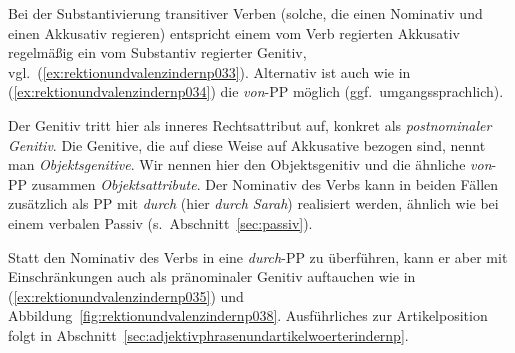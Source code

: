 \begin{exe}
  \ex\label{ex:rektionundvalenzindernp030}
  \begin{xlist}
  \end{xlist}
\end{exe}


Bei der Substantivierung transitiver Verben (solche, die einen Nominativ und einen Akkusativ regieren) entspricht einem vom Verb regierten Akkusativ regelmäßig ein vom Substantiv regierter Genitiv, vgl.\ (\ref{ex:rektionundvalenzindernp033}).
Alternativ ist auch wie in (\ref{ex:rektionundvalenzindernp034}) die \textit{von}-PP möglich (ggf.\ umgangssprachlich).

\begin{exe}
  \ex\label{ex:rektionundvalenzindernp031}
  \begin{xlist}
  \end{xlist}
\end{exe}

Der Genitiv tritt hier als inneres Rechtsattribut auf, konkret als \textit{postnominaler Genitiv}.
Die Genitive, die auf diese Weise auf Akkusative bezogen sind, nennt man \textit{Objektsgenitive}.
Wir nennen hier den Objektsgenitiv und die ähnliche \textit{von}-PP zusammen \textit{Objektsattribute}.
Der Nominativ des Verbs kann in beiden Fällen zusätzlich als PP mit \textit{durch} (hier \textit{durch Sarah}) realisiert werden, ähnlich wie bei einem verbalen Passiv (s.\ Abschnitt~\ref{sec:passiv}).


Statt den Nominativ des Verbs in eine \textit{durch}-PP zu überführen, kann er aber mit Einschränkungen auch als pränominaler Genitiv auftauchen wie in (\ref{ex:rektionundvalenzindernp035}) und Abbildung~\ref{fig:rektionundvalenzindernp038}.
Ausführliches zur Artikelposition folgt in Abschnitt~\ref{sec:adjektivphrasenundartikelwoerterindernp}.

